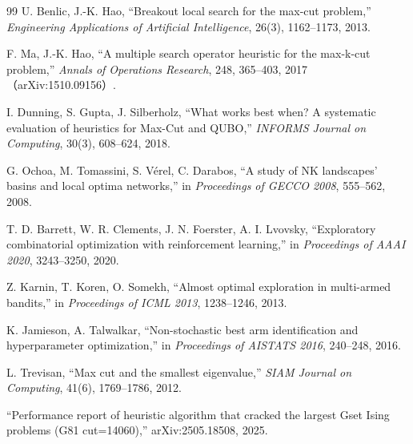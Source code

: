 \begin{thebibliography}{99}
 U. Benlic, J.-K. Hao, ``Breakout local search for the max-cut problem,'' \textit{Engineering Applications of Artificial Intelligence}, 26(3), 1162--1173, 2013.

 F. Ma, J.-K. Hao, ``A multiple search operator heuristic for the max-k-cut problem,'' \textit{Annals of Operations Research}, 248, 365--403, 2017（arXiv:1510.09156）.

 I. Dunning, S. Gupta, J. Silberholz, ``What works best when? A systematic evaluation of heuristics for Max-Cut and QUBO,'' \textit{INFORMS Journal on Computing}, 30(3), 608--624, 2018.

 G. Ochoa, M. Tomassini, S. V\'{e}rel, C. Darabos, ``A study of NK landscapes' basins and local optima networks,'' in \textit{Proceedings of GECCO 2008}, 555--562, 2008.

 T. D. Barrett, W. R. Clements, J. N. Foerster, A. I. Lvovsky, ``Exploratory combinatorial optimization with reinforcement learning,'' in \textit{Proceedings of AAAI 2020}, 3243--3250, 2020.

 Z. Karnin, T. Koren, O. Somekh, ``Almost optimal exploration in multi-armed bandits,'' in \textit{Proceedings of ICML 2013}, 1238--1246, 2013.

 K. Jamieson, A. Talwalkar, ``Non-stochastic best arm identification and hyperparameter optimization,'' in \textit{Proceedings of AISTATS 2016}, 240--248, 2016.

 L. Trevisan, ``Max cut and the smallest eigenvalue,'' \textit{SIAM Journal on Computing}, 41(6), 1769--1786, 2012.

 ``Performance report of heuristic algorithm that cracked the largest Gset Ising problems (G81 cut=14060),'' arXiv:2505.18508, 2025.

\end{thebibliography}
